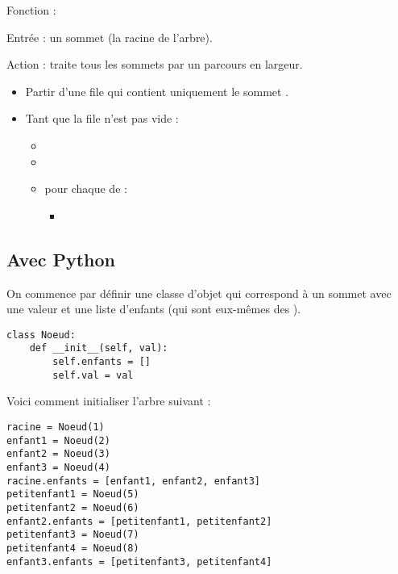\documentclass[11pt,class=report,crop=false]{standalone}
\begin{document}
\begin{algorithme}
	Fonction : 
	
	Entrée : un sommet (la racine de l'arbre).
	
	Action : traite tous les sommets par un parcours en largeur. 
	
	\begin{itemize}
		\item Partir d'une file qui contient uniquement le sommet .
		
		\item Tant que la file n'est pas vide :
		\begin{itemize}
			\item {} 
			\item {}
			\item pour chaque  de :
     		\begin{itemize}			
     			\item {}
     		\end{itemize}	
     	\end{itemize}		
	\end{itemize}  
\end{algorithme}


\subsection{Avec Python}


On commence par définir une classe d'objet  qui correspond à un sommet avec une valeur et une liste d'enfants (qui sont eux-mêmes des ).

\begin{lstlisting}
class Noeud:
    def __init__(self, val):
        self.enfants = []
        self.val = val	
\end{lstlisting}

Voici comment initialiser l'arbre suivant : 



\begin{lstlisting}
racine = Noeud(1)
enfant1 = Noeud(2)
enfant2 = Noeud(3)
enfant3 = Noeud(4)
racine.enfants = [enfant1, enfant2, enfant3]
petitenfant1 = Noeud(5)
petitenfant2 = Noeud(6)
enfant2.enfants = [petitenfant1, petitenfant2]
petitenfant3 = Noeud(7)
petitenfant4 = Noeud(8)
enfant3.enfants = [petitenfant3, petitenfant4]
\end{lstlisting}
\end{document}
